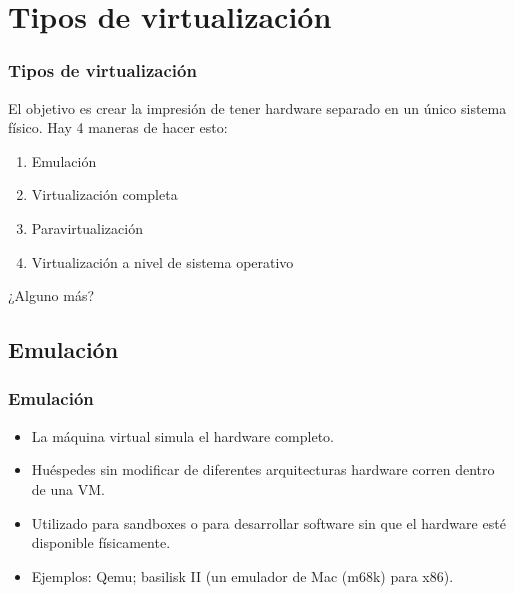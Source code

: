 \documentclass{beamer}
\begin{document}
\section{Tipos de virtualización}


\begin{frame}[<+->]
\frametitle{Tipos de virtualización}

El objetivo es crear la impresión de tener hardware separado en un único sistema físico. Hay \alert{4 maneras} de hacer esto:

\begin{enumerate}
\item \alert{Emulación}
\item \alert{Virtualización completa}
\item \alert{Paravirtualización} 
\item \alert{Virtualización a nivel de sistema operativo}
\end{enumerate}

\pause
¿Alguno más?

\end{frame}


\subsection{Emulación}

\begin{frame}
\frametitle{Emulación}

\begin{itemize}
\item La máquina virtual simula el hardware completo.
\item Huéspedes sin modificar de diferentes arquitecturas hardware corren dentro de una VM.
\item Utilizado para \alert{sandboxes} o para desarrollar software sin que el hardware esté disponible físicamente.
\item \alert{Ejemplos:} Qemu; basilisk II (un emulador de Mac (m68k) para x86).
\end{itemize}
\end{frame}
\end{document}
